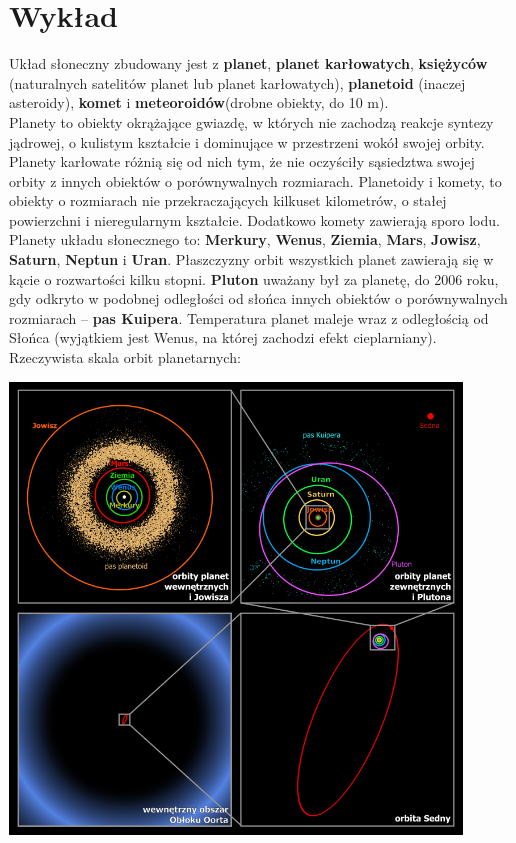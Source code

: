 \documentclass[../index.tex]{subfiles}
\begin{document}
    \section{Wykład}
        Układ słoneczny zbudowany jest z \textbf{planet}, \textbf{planet karłowatych}, \textbf{księżyców} (naturalnych satelitów planet lub planet karłowatych), \textbf{planetoid} (inaczej asteroidy), \textbf{komet} i \textbf{meteoroidów}(drobne obiekty, do 10 m).\\
        Planety to obiekty okrążające gwiazdę, w których nie zachodzą reakcje syntezy jądrowej, o kulistym kształcie i dominujące w przestrzeni wokół swojej orbity. Planety karłowate różnią się od nich tym, że nie oczyściły sąsiedztwa swojej orbity z innych obiektów o porównywalnych rozmiarach. Planetoidy i komety, to obiekty o rozmiarach nie przekraczających kilkuset kilometrów, o stałej powierzchni i nieregularnym kształcie. Dodatkowo komety zawierają sporo lodu. \\
        Planety układu słonecznego to: \textbf{Merkury}, \textbf{Wenus}, \textbf{Ziemia}, \textbf{Mars}, \textbf{Jowisz}, \textbf{Saturn}, \textbf{Neptun} i \textbf{Uran}. Płaszczyzny orbit wszystkich planet zawierają się w kącie o rozwartości kilku stopni. \textbf{Pluton} uważany był za planetę, do 2006 roku, gdy odkryto w podobnej odległości od słońca innych obiektów o porównywalnych rozmiarach – \textbf{pas Kuipera}. Temperatura planet maleje wraz z odległością od Słońca (wyjątkiem jest Wenus, na której zachodzi efekt cieplarniany). Rzeczywista skala orbit planetarnych:
        \begin{center}
            \includegraphics[width=12cm]{images/orbityPlanet}
        \end{center}
\end{document}
